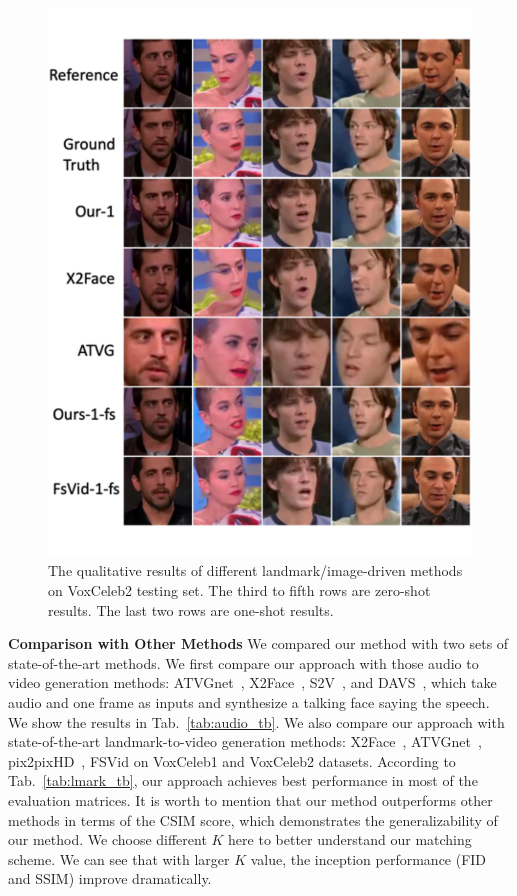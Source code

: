 \documentclass[runningheads]{llncs}
\begin{document}
\begin{figure}
\includegraphics[width=0.95 \linewidth]{latex/images/compare1_reduce.pdf}
\caption{The qualitative results of different landmark/image-driven methods on VoxCeleb2 testing set. The third to fifth rows are zero-shot results. The last two rows are one-shot results.}
\label{fig:compare1}
\end{figure}


\noindent \textbf{Comparison with Other Methods} \quad We compared our method with two sets of state-of-the-art methods. We first compare our approach with those audio to video generation methods: ATVGnet~\cite{chen2019hierarchical}, X2Face~\cite{wiles2018x2face}, S2V~\cite{chung2017you}, and DAVS~\cite{zhou2019talking}, which take audio and one frame as inputs and synthesize a talking face saying the speech. We show the results in Tab.~\ref{tab:audio_tb}.
We also compare our approach with state-of-the-art landmark-to-video generation methods: X2Face~\cite{wiles2018x2face}, ATVGnet~\cite{chen2019hierarchical}, pix2pixHD~\cite{wang2018high}, FSVid\cite{zakharov2019few} on VoxCeleb1 and VoxCeleb2 datasets. According to Tab.~\ref{tab:lmark_tb}, our approach achieves best performance in most of the evaluation matrices. It is worth to mention that our method outperforms other methods in terms of the CSIM score, which demonstrates the generalizability of our method. We choose different $K$ here to better understand our matching scheme. We can see that with larger $K$ value, the inception performance (FID and SSIM) improve dramatically. 
\end{document}
